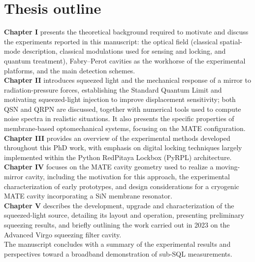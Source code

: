 \section*{Thesis outline}
 


\noindent \textbf{Chapter I} presents the theoretical background required to motivate and discuss the experiments reported in this manuscript: the optical field (classical spatial-mode description, classical modulations used for sensing and locking, and quantum treatment), Fabry–Perot cavities as the workhorse of the experimental platforms, and the main detection schemes. \\ 

\noindent \textbf{Chapter II} introduces squeezed light and the mechanical response of a mirror to radiation-pressure forces, establishing the Standard Quantum Limit and motivating squeezed-light injection to improve displacement sensitivity; both QSN and QRPN are discussed, together with numerical tools used to compute noise spectra in realistic situations. It also presents the specific properties of membrane-based optomechanical systems, focusing on the MATE configuration. \\ 

\noindent \textbf{Chapter III} provides an overview of the experimental methods developed throughout this PhD work, with emphasis on digital locking techniques largely implemented within the Python RedPitaya Lockbox (PyRPL) architecture. \\

\noindent \textbf{Chapter IV} focuses on the MATE cavity geometry used to realize a moving-mirror cavity, including the motivation for this approach, the experimental characterization of early prototypes, and design considerations for a cryogenic MATE cavity incorporating a SiN membrane resonator. \\ 

\noindent \textbf{Chapter V} describes the development, upgrade and characterization of the squeezed-light source, detailing its layout and operation, presenting preliminary squeezing results, and briefly outlining the work carried out in 2023 on the Advanced Virgo squeezing filter cavity.  \\

\noindent The manuscript concludes with a summary of the experimental results and perspectives toward a broadband demonstration of sub-SQL measurements.
\newpage 